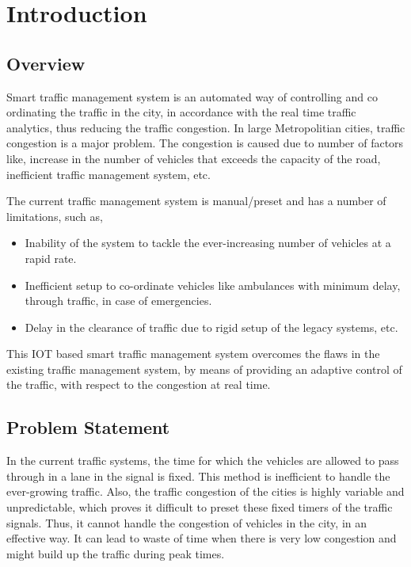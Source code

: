 \chapter{Introduction}

\section{Overview}
Smart traffic management system is an automated way of controlling and co ordinating the traffic in the city, in accordance with the real time traffic analytics, thus reducing the traffic congestion. In large Metropolitian cities, traffic congestion is a major problem. The congestion is caused due to number of factors like, increase in the number of vehicles that exceeds the capacity of the road, inefficient traffic management system, etc.

The current traffic management system is manual/preset and has a number of limitations, such as,
\begin{itemize}
\item Inability of the system to tackle the ever-increasing number of vehicles at a rapid rate.
\item Inefficient setup to co-ordinate vehicles like ambulances with minimum delay, through traffic, in case of emergencies.
\item Delay in the clearance of traffic due to rigid setup of the legacy systems, etc.
\end{itemize}

This IOT based smart traffic management system overcomes the flaws in the existing traffic management system, by means of providing an adaptive control of the traffic, with respect to the congestion at real time.

\pagebreak

\section{Problem Statement}
In the current traffic systems, the time for which the vehicles are allowed to pass through in a lane in the signal is fixed. This method is inefficient to handle the ever-growing traffic. Also, the traffic congestion of the cities is highly variable and unpredictable, which proves it difficult to preset these fixed timers of the traffic signals. Thus, it cannot handle the congestion of vehicles in the city, in an effective way. It can lead to waste of time when there is very low congestion and might build up the traffic during peak times.

